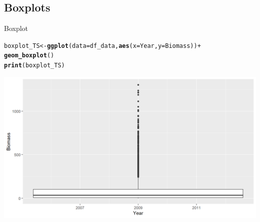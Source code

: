 \documentclass{beamer}\usepackage[]{graphicx}\usepackage[]{color}
\makeatletter
\newcommand{\hlopt}[1]{\textcolor[rgb]{0,0,0}{#1}}%
\newcommand{\hlstd}[1]{\textcolor[rgb]{0.345,0.345,0.345}{#1}}%
\newcommand{\hlkwb}[1]{\textcolor[rgb]{0.69,0.353,0.396}{#1}}%
\newcommand{\hlkwc}[1]{\textcolor[rgb]{0.333,0.667,0.333}{#1}}%
\newcommand{\hlkwd}[1]{\textcolor[rgb]{0.737,0.353,0.396}{\textbf{#1}}}%
\newenvironment{kframe}{%
 \def\at@end@of@kframe{}%
 \ifinner\ifhmode%
  \def\at@end@of@kframe{\end{minipage}}%
  \begin{minipage}{\columnwidth}%
 \fi\fi%
 \def\FrameCommand##1{\hskip\@totalleftmargin \hskip-\fboxsep
 \colorbox{shadecolor}{##1}\hskip-\fboxsep
     \hskip-\linewidth \hskip-\@totalleftmargin \hskip\columnwidth}%
 \MakeFramed {\advance\hsize-\width
   \@totalleftmargin\z@ \linewidth\hsize
   \@setminipage}}%
 {\par\unskip\endMakeFramed%
 \at@end@of@kframe}
\newenvironment{knitrout}{}{} %
\makeatother
\begin{document}
\subsection{Boxplots}
\begin{frame}[fragile]{Boxplot}
\begin{knitrout}\footnotesize
{}\color{fgcolor}\begin{kframe}
\begin{alltt}
\hlstd{boxplot_TS} \hlkwb{<-} \hlkwd{ggplot}\hlstd{(}\hlkwc{data}\hlstd{=df_data,} \hlkwd{aes}\hlstd{(}\hlkwc{x}\hlstd{=Year,} \hlkwc{y}\hlstd{=Biomass))} \hlopt{+}
  \hlkwd{geom_boxplot}\hlstd{()}
\hlkwd{print}\hlstd{(boxplot_TS)}
\end{alltt}


{\ttfamily\noindent\color{warningcolor}{\#\# Warning: Continuous x aesthetic -- did you forget aes(group=...)?}}\end{kframe}

{\centering \includegraphics[width=.9\linewidth]{figure/boxplot_TS-1} 

}



\end{knitrout}
\end{frame}
\end{document}
